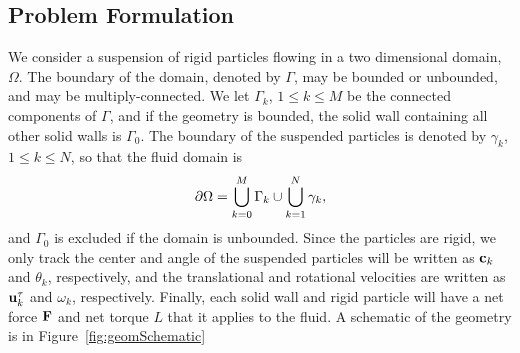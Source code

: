 \documentclass[preprint, 10pt]{elsarticle}
\begin{document}
\subsection{Problem Formulation}

We consider a suspension of rigid particles flowing in a two dimensional
domain, $\Omega$.  The boundary of the domain, denoted by $\Gamma$, may
be bounded or unbounded, and may be multiply-connected.  We let
$\Gamma_k$, $1 \leq k \leq M$ be the connected components of $\Gamma$,
and if the geometry is bounded, the solid wall containing all other
solid walls is $\Gamma_0$.  The boundary of the suspended particles is
denoted by $\gamma_k$, $1 \leq k \leq N$, so that the fluid domain is
\begin{align*}
  {\partial}\Omega = \bigcup_{k=0}^M \Gamma_k \cup \bigcup_{k=1}^N \gamma_k,
\end{align*}
and $\Gamma_0$ is excluded if the domain is unbounded.  Since the
particles are rigid, we only track the center and angle of the suspended
particles will be written as ${\mathbf{c}}_k$ and $\theta_k$, respectively, and
the translational and rotational velocities are written as ${\mathbf{u}}_k^\tau$
and $\omega_k$, respectively.  Finally, each solid wall and rigid
particle will have a net force ${\mathbf{F}}$ and net torque $L$ that it applies
to the fluid.  A schematic of the geometry is in
Figure~\ref{fig:geomSchematic}

%
\end{document}
